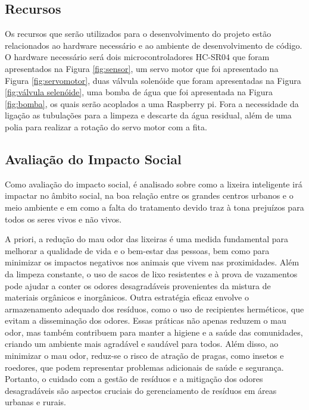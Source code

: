 \subsection{Recursos}
Os recursos que serão utilizados para o desenvolvimento do projeto estão relacionados ao hardware necessário e ao ambiente de desenvolvimento de código. O hardware necessário será dois microcontroladores HC-SR04 que foram apresentados na Figura \ref{fig:sensor}, um servo motor que foi apresentado na Figura \ref{fig:servomotor}, duas válvula solenóide que foram apresentadas na Figura \ref{fig:válvula selenóide}, uma bomba de água que foi apresentada na Figura \ref{fig:bomba}, os quais serão acoplados a uma Raspberry pi. Fora a necessidade da ligação as tubulações para a limpeza e descarte da água residual, além de uma polia para realizar a rotação do servo motor com a fita.

\subsection{Avaliação do Impacto Social}
Como avaliação do impacto social, é analisado sobre como a lixeira inteligente irá impactar no âmbito social, na boa relação entre os grandes centros urbanos e o meio ambiente e em como a falta do tratamento devido traz à tona prejuízos para todos os seres vivos e não vivos. 

A priori, a redução do mau odor das lixeiras é uma medida fundamental para melhorar a qualidade de vida e o bem-estar das pessoas, bem como para minimizar os impactos negativos nos animais que vivem nas proximidades. Além da limpeza constante, o uso de sacos de lixo resistentes e à prova de vazamentos pode ajudar a conter os odores desagradáveis provenientes da mistura de materiais orgânicos e inorgânicos. Outra estratégia eficaz envolve o armazenamento adequado dos resíduos, como o uso de recipientes herméticos, que evitam a disseminação dos odores. Essas práticas não apenas reduzem o mau odor, mas também contribuem para manter a higiene e a saúde das comunidades, criando um ambiente mais agradável e saudável para todos. Além disso, ao minimizar o mau odor, reduz-se o risco de atração de pragas, como insetos e roedores, que podem representar problemas adicionais de saúde e segurança. Portanto, o cuidado com a gestão de resíduos e a mitigação dos odores desagradáveis são aspectos cruciais do gerenciamento de resíduos em áreas urbanas e rurais.

